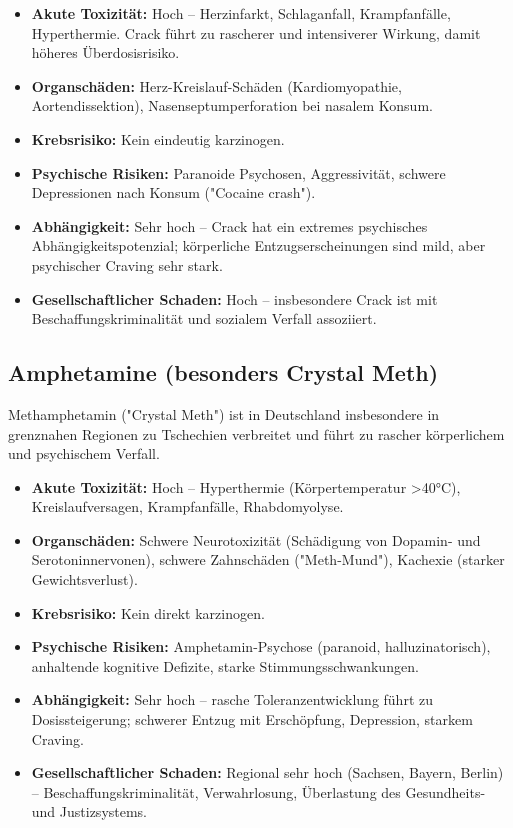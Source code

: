 \documentclass[11pt,a4paper]{article}
\begin{document}
	\begin{itemize}[leftmargin=*, noitemsep]
		\item \textbf{Akute Toxizität:} Hoch – Herzinfarkt, Schlaganfall, Krampfanfälle, Hyperthermie. Crack führt zu rascherer und intensiverer Wirkung, damit höheres Überdosisrisiko.
		\item \textbf{Organschäden:} Herz-Kreislauf-Schäden (Kardiomyopathie, Aortendissektion), Nasenseptumperforation bei nasalem Konsum.
		\item \textbf{Krebsrisiko:} Kein eindeutig karzinogen.
		\item \textbf{Psychische Risiken:} Paranoide Psychosen, Aggressivität, schwere Depressionen nach Konsum ("Cocaine crash").
		\item \textbf{Abhängigkeit:} Sehr hoch – Crack hat ein extremes psychisches Abhängigkeitspotenzial; körperliche Entzugserscheinungen sind mild, aber psychischer Craving sehr stark.
		\item \textbf{Gesellschaftlicher Schaden:} Hoch – insbesondere Crack ist mit Beschaffungskriminalität und sozialem Verfall assoziiert.
	\end{itemize}
	
	\subsection{Amphetamine (besonders Crystal Meth)}
	
	Methamphetamin ("Crystal Meth") ist in Deutschland insbesondere in grenznahen Regionen zu Tschechien verbreitet und führt zu rascher körperlichem und psychischem Verfall. \cite{dhs-crystal}
	
	\begin{itemize}[leftmargin=*, noitemsep]
		\item \textbf{Akute Toxizität:} Hoch – Hyperthermie (Körpertemperatur >40°C), Kreislaufversagen, Krampfanfälle, Rhabdomyolyse.
		\item \textbf{Organschäden:} Schwere Neurotoxizität (Schädigung von Dopamin- und Serotoninnervonen), schwere Zahnschäden ("Meth-Mund"), Kachexie (starker Gewichtsverlust).
		\item \textbf{Krebsrisiko:} Kein direkt karzinogen.
		\item \textbf{Psychische Risiken:} Amphetamin-Psychose (paranoid, halluzinatorisch), anhaltende kognitive Defizite, starke Stimmungsschwankungen.
		\item \textbf{Abhängigkeit:} Sehr hoch – rasche Toleranzentwicklung führt zu Dosissteigerung; schwerer Entzug mit Erschöpfung, Depression, starkem Craving.
		\item \textbf{Gesellschaftlicher Schaden:} Regional sehr hoch (Sachsen, Bayern, Berlin) – Beschaffungskriminalität, Verwahrlosung, Überlastung des Gesundheits- und Justizsystems.
	\end{itemize}
	
\end{document}
